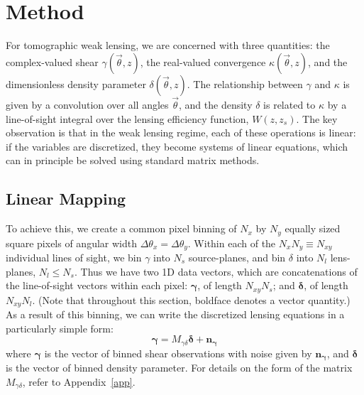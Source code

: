 \documentclass[twocolumn]{emulateapj}
\newcommand{\myvec}[1]{\boldsymbol{#1}}
\begin{document}
\section{Method}
\label{Method}

For tomographic weak lensing, we are concerned with three quantities:  the 
complex-valued shear $\gamma(\vec\theta,z)$, the real-valued convergence
$\kappa(\vec\theta,z)$, and the dimensionless density parameter 
$\delta(\vec\theta,z)$.  
The relationship between $\gamma$ and $\kappa$ is given
by a convolution over all angles $\vec\theta$, and the density $\delta$ is
related to $\kappa$ by a line-of-sight integral over the lensing efficiency
function, $W(z,z_s)$.  The key observation is that in the weak lensing regime,
each of these operations is linear: if the variables are discretized, 
they become systems of linear equations, 
which can in principle be solved using standard matrix methods.

\subsection{Linear Mapping}
\label{LinearMapping}

To achieve this, we create a common pixel binning of 
$N_x$ by $N_y$ equally sized square pixels
of angular width $\Delta\theta_x = \Delta\theta_y$.  
Within each of the $N_x N_y \equiv N_{xy}$ individual
lines of sight, we bin $\gamma$ into $N_s$ source-planes,
and bin $\delta$ into $N_l$ lens-planes, $N_l \le N_s$.  
Thus we have two 1D data vectors, which are concatenations of
the line-of-sight vectors within each pixel:
 $\myvec\gamma$, of length $N_{xy} N_s$; 
and $\myvec\delta$, of length $N_{xy} N_l$.  
(Note that throughout this section, boldface denotes a vector quantity.)  
As a result of this binning, we can write the discretized lensing 
equations in a particularly simple form:
\begin{equation}
  \label{M_gd}
  \myvec\gamma = M_{\gamma\delta}\myvec\delta + \myvec{n_\gamma}
\end{equation}
where $\myvec\gamma$ is the vector of binned shear observations with noise
given by $\myvec{n_\gamma}$, and $\myvec\delta$ is the vector 
of binned density parameter.  For details on the form of 
the matrix $M_{\gamma\delta}$, refer to Appendix~\ref{app}.
\end{document}
